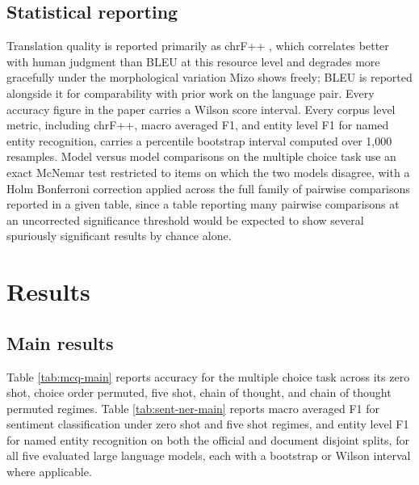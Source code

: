 \documentclass[pdflatex,sn-mathphys-ay]{sn-jnl}
\begin{document}
\subsection{Statistical reporting}

Translation quality is reported primarily as chrF++ \citep{popovic2015chrf,popovic2017chrfpp}, which correlates better with human judgment than BLEU at this resource level and degrades more gracefully under the morphological variation Mizo shows freely; BLEU is reported alongside it for comparability with prior work on the language pair. Every accuracy figure in the paper carries a Wilson score interval. Every corpus level metric, including chrF++, macro averaged F1, and entity level F1 for named entity recognition, carries a percentile bootstrap interval computed over 1,000 resamples. Model versus model comparisons on the multiple choice task use an exact McNemar test restricted to items on which the two models disagree, with a Holm Bonferroni correction applied across the full family of pairwise comparisons reported in a given table, since a table reporting many pairwise comparisons at an uncorrected significance threshold would be expected to show several spuriously significant results by chance alone.

\section{Results}
\label{sec:results}

\subsection{Main results}

Table \ref{tab:mcq-main} reports accuracy for the multiple choice task across its zero shot, choice order permuted, five shot, chain of thought, and chain of thought permuted regimes. Table \ref{tab:sent-ner-main} reports macro averaged F1 for sentiment classification under zero shot and five shot regimes, and entity level F1 for named entity recognition on both the official and document disjoint splits, for all five evaluated large language models, each with a bootstrap or Wilson interval where applicable.
\end{document}
